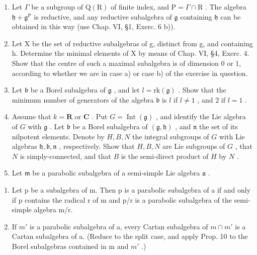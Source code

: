 
\begin{enumerate}
\def\labelenumi{\arabic{enumi})}
\item
  Let \(\Gamma\) be a subgroup of \(\mathrm{Q}(\mathrm{R})\) of finite index, and \(\mathrm{P} = \Gamma \cap \mathrm{R}\) . The algebra \(\mathfrak{h} + \mathfrak{g}^{\mathrm{P}}\) is reductive, and any reductive subalgebra of \(\mathfrak{g}\) containing \(\mathfrak{h}\) can be obtained in this way (use Chap. VI, §1, Exerc. 6 b)).
\item
  Let X be the set of reductive subalgebras of g, distinct from g, and containing h. Determine the minimal elements of X by means of Chap. VI, §4, Exerc. 4. Show that the centre of such a maximal subalgebra is of dimension 0 or 1, according to whether we are in case a) or case b) of the exercise in question.
\item
  Let \(\mathfrak{b}\) be a Borel subalgebra of \(\mathfrak{g}\) , and let \(l = \mathrm{rk}(\mathfrak{g})\) . Show that the minimum number of generators of the algebra \(\mathfrak{b}\) is \(l\) if \(l \neq 1\) , and 2 if \(l = 1\) .
\item
  Assume that \(k = \mathbf{R}\) or \(\mathbf{C}\) . Put \(G = \operatorname{Int}(\mathfrak{g})\) , and identify the Lie algebra of \(G\) with \(\mathfrak{g}\) . Let \(\mathfrak{b}\) be a Borel subalgebra of \((\mathfrak{g},\mathfrak{h})\) , and \(\mathfrak{n}\) the set of its nilpotent elements. Denote by \(H,B,N\) the integral subgroups of \(G\) with Lie algebras \(\mathfrak{h},\mathfrak{b},\mathfrak{n}\) , respectively. Show that \(H,B,N\) are Lie subgroups of \(G\) , that \(N\) is simply-connected, and that \(B\) is the semi-direct product of \(H\) by \(N\) .
\item
  Let \(\mathfrak{m}\) be a parabolic subalgebra of a semi-simple Lie algebra \(\mathfrak{a}\) .
\end{enumerate}

\begin{enumerate}
\def\labelenumi{\alph{enumi})}
\item
  Let p be a subalgebra of m. Then p is a parabolic subalgebra of a if and only if p contains the radical r of m and p/r is a parabolic subalgebra of the semi-simple algebra m/r.
\item
  If \(m'\) is a parabolic subalgebra of a, every Cartan subalgebra of \(m \cap m'\) is a Cartan subalgebra of a. (Reduce to the split case, and apply Prop. 10 to the Borel subalgebras contained in m and \(m'\) .)
\end{enumerate}

